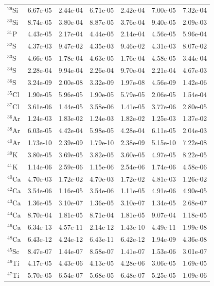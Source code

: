 \begin{table}
\begin{tabular}{l|cc|cc|cc}
$^{29}$Si & 6.67e-05 & 2.44e-04 & 6.71e-05 & 2.42e-04 & 7.00e-05 & 7.32e-04\\
$^{30}$Si & 8.74e-05 & 3.80e-04 & 8.87e-05 & 3.76e-04 & 9.40e-05 & 2.09e-03\\
$^{31}$P & 4.43e-05 & 2.17e-04 & 4.44e-05 & 2.14e-04 & 4.56e-05 & 5.96e-04\\
$^{32}$S & 4.37e-03 & 9.47e-02 & 4.35e-03 & 9.46e-02 & 4.31e-03 & 8.07e-02\\
$^{33}$S & 4.66e-05 & 1.78e-04 & 4.63e-05 & 1.76e-04 & 4.58e-05 & 3.44e-04\\
$^{34}$S & 2.28e-04 & 9.94e-04 & 2.26e-04 & 9.70e-04 & 2.21e-04 & 4.67e-03\\
$^{36}$S & 3.24e-09 & 2.00e-08 & 3.32e-09 & 1.97e-08 & 4.56e-09 & 1.42e-06\\
$^{35}$Cl & 1.90e-05 & 5.96e-05 & 1.90e-05 & 5.79e-05 & 2.06e-05 & 1.54e-04\\
$^{37}$Cl & 3.61e-06 & 1.44e-05 & 3.58e-06 & 1.41e-05 & 3.77e-06 & 2.80e-05\\
$^{36}$Ar & 1.24e-03 & 1.83e-02 & 1.24e-03 & 1.82e-02 & 1.25e-03 & 1.37e-02\\
$^{38}$Ar & 6.03e-05 & 4.42e-04 & 5.98e-05 & 4.28e-04 & 6.11e-05 & 2.04e-03\\
$^{40}$Ar & 1.73e-10 & 2.39e-09 & 1.79e-10 & 2.38e-09 & 5.15e-10 & 7.22e-08\\
$^{39}$K & 3.80e-05 & 3.69e-05 & 3.82e-05 & 3.60e-05 & 4.97e-05 & 8.22e-05\\
$^{41}$K & 1.14e-06 & 2.59e-06 & 1.15e-06 & 2.54e-06 & 1.74e-06 & 4.58e-06\\
$^{40}$Ca & 4.70e-03 & 1.72e-02 & 4.70e-03 & 1.72e-02 & 4.81e-03 & 1.26e-02\\
$^{42}$Ca & 3.54e-06 & 1.16e-05 & 3.54e-06 & 1.11e-05 & 4.91e-06 & 4.90e-05\\
$^{43}$Ca & 1.36e-05 & 3.10e-07 & 1.36e-05 & 3.10e-07 & 1.34e-05 & 2.68e-07\\
$^{44}$Ca & 8.70e-04 & 1.81e-05 & 8.71e-04 & 1.81e-05 & 9.07e-04 & 1.18e-05\\
$^{46}$Ca & 6.34e-13 & 4.57e-11 & 2.14e-12 & 1.43e-10 & 4.49e-11 & 1.99e-08\\
$^{48}$Ca & 6.43e-12 & 4.24e-12 & 6.43e-11 & 6.42e-12 & 1.94e-09 & 4.36e-08\\
$^{45}$Sc & 8.47e-07 & 1.44e-07 & 8.58e-07 & 1.41e-07 & 1.53e-06 & 3.01e-07\\
$^{46}$Ti & 4.17e-05 & 4.43e-06 & 4.13e-05 & 4.28e-06 & 3.06e-05 & 1.69e-05\\
$^{47}$Ti & 5.70e-05 & 6.54e-07 & 5.68e-05 & 6.48e-07 & 5.25e-05 & 1.09e-06\\

\end{tabular}
\end{table}
